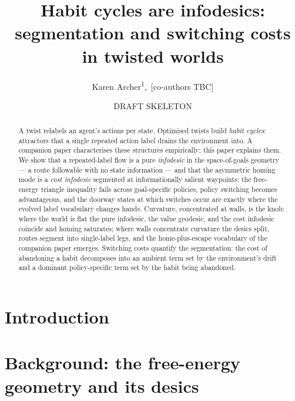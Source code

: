 \documentclass[a4paper, notitlepage, 11pt]{article}
\title{Habit cycles are infodesics:\\ segmentation and switching costs in twisted worlds}
\author{%
  Karen Archer\textsuperscript{1},\,
  [co-authors TBC]%
}
\date{DRAFT SKELETON}
\theoremstyle{plain}
\begin{document}
\maketitle

\begin{abstract}
A twist relabels an agent's actions per state.  Optimised twists build
\emph{habit cycles}: attractors that a single repeated action label drains
the environment into.  A companion paper characterises these structures
empirically; this paper explains them.  We show that a repeated-label flow
is a pure \emph{infodesic} in the space-of-goals geometry --- a route
followable with no state information --- and that the asymmetric homing
mode is a \emph{cost infodesic} segmented at informationally salient
waypoints: the free-energy triangle inequality fails across goal-specific
policies, policy switching becomes advantageous, and the doorway states at
which switches occur are exactly where the evolved label vocabulary changes
hands.  Curvature, concentrated at walls, is the knob: where the world is
flat the pure infodesic, the value geodesic, and the cost infodesic
coincide and homing saturates; where walls concentrate curvature the desics
split, routes segment into single-label legs, and the home-plus-escape
vocabulary of the companion paper emerges.  Switching costs quantify the
segmentation: the cost of abandoning a habit decomposes into an ambient
term set by the environment's drift and a dominant policy-specific term set
by the habit being abandoned.
\end{abstract}

\section{Introduction}
\label{sec:intro}

%

\section{Background: the free-energy geometry and its desics}
\label{sec:background}
\end{document}
